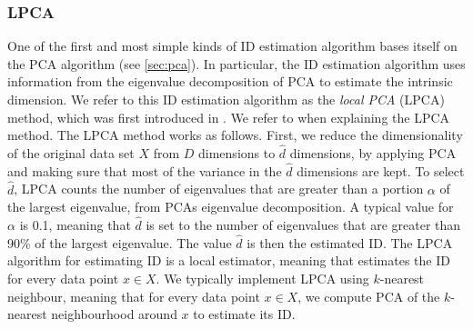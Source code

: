 \subsubsection{LPCA}
\label{sec:id-estimation-lpca}
One of the first and most simple kinds of ID estimation algorithm bases itself on the PCA algorithm (see \cref{sec:pca}). In particular, the ID estimation algorithm uses information from the eigenvalue decomposition of PCA to estimate the intrinsic dimension. We refer to this ID estimation algorithm as the \textit{local PCA} (LPCA) method, which was first introduced in \cite{Fukunaga1971}. We refer to \cite{Fukunaga1971} when explaining the LPCA method. The LPCA method works as follows. First, we reduce the dimensionality of the original data set $X$ from $D$ dimensions to $\hat{d}$ dimensions, by applying PCA and making sure that most of the variance in the $\hat{d}$ dimensions are kept. To select $\hat{d}$, LPCA counts the number of eigenvalues that are greater than a portion $\alpha$ of the largest eigenvalue, from PCAs eigenvalue decomposition. A typical value for $\alpha$ is 0.1, meaning that $\hat{d}$ is set to the number of eigenvalues that are greater than 90\% of the largest eigenvalue. The value $\hat{d}$ is then the estimated ID. The LPCA algorithm for estimating ID is a local estimator, meaning that estimates the ID for every data point $x \in X$. We typically implement LPCA using $k$-nearest neighbour, meaning that for every data point $x \in X$, we compute PCA of the $k$-nearest neighbourhood around $x$ to estimate its ID.

